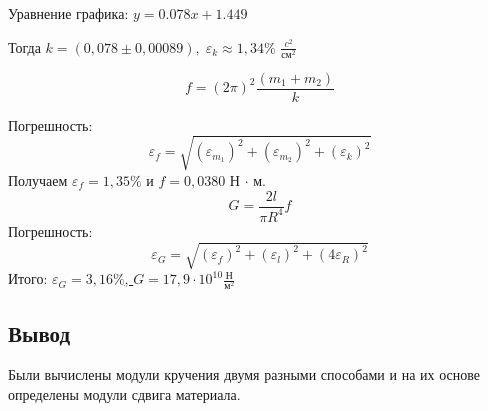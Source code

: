 \documentclass[a4paper, 12pt]{article}
\begin{document}
\begin{center}
    Уравнение графика: $y=0.078x+1.449$

    \bigskip

Тогда $k = (0,078 \pm  0,00089), \; \varepsilon_{k} \approx 1,34\%$ $\frac{c^2}{\text{см}^2}$

\begin{equation}    
    f = (2\pi)^2\frac{(m_{1}+m_{2})}{k}
\end{equation}

\newpage

Погрешность:
\[
    \varepsilon_{f} = \sqrt{(\varepsilon_{m_{1}})^2 + (\varepsilon_{m_{2}})^2 + (\varepsilon_{k})^2} 
\]
Получаем $\varepsilon_{f} = 1,35\%$ и $f = 0,0380$ Н $\cdot$ м.\\
\[
    G=\frac{2l}{\pi R^{4}}f
\]
Погрешность:
\[
    \varepsilon_{G} = \sqrt{(\varepsilon_{f})^2 + (\varepsilon_{l})^2 + (4\varepsilon_{R})^2} 
\]
Итого: \underline{$\varepsilon_{G} = 3,16\%$, $G = 17,9 \cdot 10^{10} \frac{\text{Н}}{\text{м}^2}$} 

\end{center}

\begin{center}
    \section*{Вывод}
    Были вычислены модули кручения двумя разными способами и на их основе определены модули сдвига материала.
\end{center}
    
\end{document}
